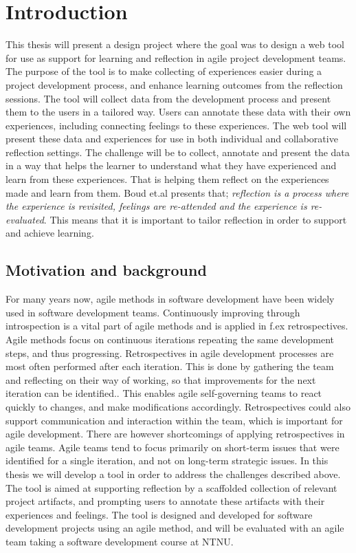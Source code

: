 \chapter{Introduction}
This thesis will present a design project where the goal was to design a web tool for use as support for learning and reflection in agile project development teams. The purpose of the tool is to make collecting of experiences easier during a project development process, and enhance learning outcomes from the reflection sessions. The tool will collect data from the development process and present them to the users in a tailored way. Users can annotate these data with their own experiences, including connecting feelings to these experiences. The web tool will present these data and experiences for use in both individual and collaborative reflection settings. The challenge will be to collect, annotate and present the data in a way that helps the learner to understand what they have experienced and learn from these experiences. That is helping them reflect on the experiences made and learn from them. Boud et.al\cite{boudreflection1985} presents that; \emph{reflection is a process where the experience is revisited, feelings are re-attended and the experience is re-evaluated}. This means that it is important to tailor reflection in order to support and achieve learning.

\section{Motivation and background}
For many years now, agile methods in software development have been widely used in software development teams. Continuously improving through introspection is a vital part of agile methods and is applied in f.ex retrospectives\cite{Beck1999, Derby2006, Maham2008}. Agile methods focus on continuous iterations repeating the same development steps, and thus progressing. Retrospectives in agile development processes are most often performed after each iteration. This is done by gathering the team and reflecting on their way of working, so that improvements for the next iteration can be identified.\cite{Derby2006, Drury2011}. This enables agile self-governing teams to react quickly to changes, and make modifications accordingly\cite{Drury2011}. Retrospectives could also support communication and interaction within the team, which is important for agile development. There are however shortcomings of applying retrospectives in agile teams. Agile teams tend to focus primarily on short-term issues that were identified for a single iteration, and not on long-term strategic issues\cite{Drury2011}. 
In this thesis we will develop a tool in order to address the challenges described above. The tool is aimed at supporting reflection by a scaffolded collection of relevant project artifacts, and prompting users to annotate these artifacts with their experiences and feelings. The tool is designed and developed for software development projects using an agile method, and will be evaluated with an agile team taking a software development course at NTNU. 

